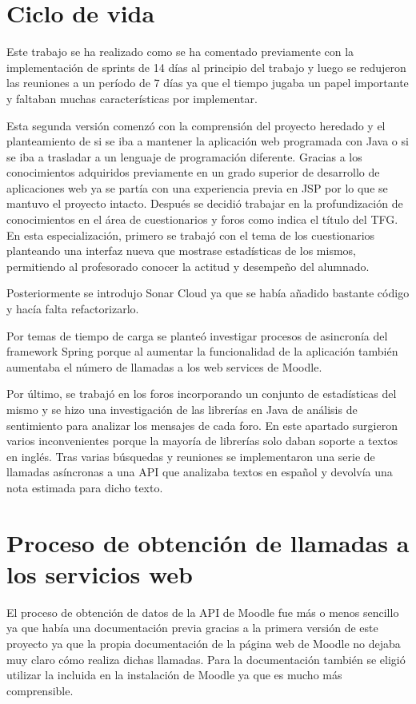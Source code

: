 \section{Ciclo de vida}
Este trabajo se ha realizado como se ha comentado previamente con la implementación de sprints de 14 días al principio del trabajo y luego se redujeron las reuniones a un período de 7 días ya que el tiempo jugaba un papel importante y faltaban muchas características por implementar.

Esta segunda versión comenzó con la comprensión del proyecto heredado y el planteamiento de si se iba a mantener la aplicación web programada con Java o si se iba a trasladar a un lenguaje de programación diferente. Gracias a los conocimientos adquiridos previamente en un grado superior de desarrollo de aplicaciones web ya se partía con una experiencia previa en JSP por lo que se mantuvo el proyecto intacto.
Después se decidió trabajar en la profundización de conocimientos en el área de cuestionarios y foros como indica el título del TFG. En esta especialización, primero se trabajó con el tema de los cuestionarios planteando una interfaz nueva que mostrase estadísticas de los mismos, permitiendo al profesorado conocer la actitud y desempeño del alumnado.

Posteriormente se introdujo Sonar Cloud ya que se había añadido bastante código y hacía falta refactorizarlo.

Por temas de tiempo de carga se planteó investigar procesos de asincronía del framework Spring porque al aumentar la funcionalidad de la aplicación también aumentaba el número de llamadas a los web services de Moodle.

Por último, se trabajó en los foros incorporando un conjunto de estadísticas del mismo y se hizo una investigación de las librerías en Java de análisis de sentimiento para analizar los mensajes de cada foro. En este apartado surgieron varios inconvenientes porque la mayoría de librerías solo daban soporte a textos en inglés. Tras varias búsquedas y reuniones se implementaron una serie de llamadas asíncronas a una API que analizaba textos en español y devolvía una nota estimada para dicho texto.

\section{Proceso de obtención de llamadas a los servicios web}
El proceso de obtención de datos de la API de Moodle fue más o menos sencillo ya que había una documentación previa gracias a la primera versión de este proyecto ya que la propia documentación de la página web de Moodle no dejaba muy claro cómo realiza dichas llamadas.
Para la documentación también se eligió utilizar la incluida en la instalación de Moodle ya que es mucho más comprensible.

